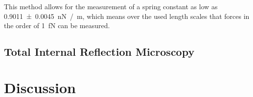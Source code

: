 \documentclass[
    parskip=half, 
    twoside=false,
    twocolumn=true,
    fontsize=11pt,
]{scrarticle}
\begin{document}
This method allows for the measurement of a spring constant as low as \SI{0.9011(45)}{\nano N /m}, which means over the used length scales that forces in the order of \SI{1}{\femto N} can be measured.



\clearpage
\subsection{Total Internal Reflection Microscopy}

\clearpage
\section{Discussion}
\blindtext

\nocite{*}
\printbibliography
\end{document}
